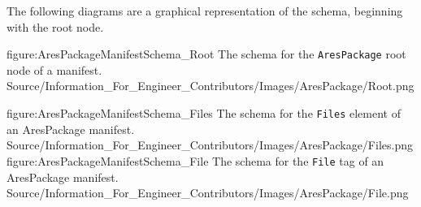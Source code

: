 The following diagrams are a graphical representation of the schema, beginning with the root node.

\FullPageLandscapeDiagram
    {figure:AresPackageManifestSchema_Root}
    {The schema for the {\tt AresPackage} root node of a manifest.}
    {Source/Information_For_Engineer_Contributors/Images/AresPackage/Root.png}

\FullPageLandscapeDiagram
    {figure:AresPackageManifestSchema_Files}
    {The schema for the {\tt Files} element of an AresPackage manifest.}
    {Source/Information_For_Engineer_Contributors/Images/AresPackage/Files.png}
\FullPageLandscapeDiagram
    {figure:AresPackageManifestSchema_File}
    {The schema for the {\tt File} tag of an AresPackage manifest.}
    {Source/Information_For_Engineer_Contributors/Images/AresPackage/File.png}

